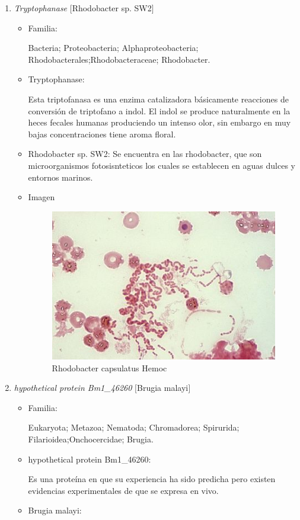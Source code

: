 \begin{enumerate}
	\item \emph{Tryptophanase} $[$Rhodobacter sp. SW2$]$~\cite{match3}
	\begin{itemize}
		\item Familia:
			
			Bacteria; Proteobacteria; Alphaproteobacteria; Rhodobacterales;Rhodobacteraceae; Rhodobacter.
		\item Tryptophanase:

			Esta triptofanasa es una enzima catalizadora básicamente reacciones de conversión de triptofano
			a indol.
			El indol se produce naturalmente en la heces fecales humanas produciendo un intenso olor,
			sin embargo en muy bajas concentraciones tiene aroma floral.
		\item Rhodobacter sp. SW2:
			Se encuentra en las rhodobacter, que son microorganismos fotosisnteticos los cuales
			se establecen en aguas dulces y entornos marinos.
		\item Imagen\\
			\begin{figure}[!h]
			\begin{center}
				\includegraphics[width=0.32\linewidth, height=!]{img/3}
				\caption{Rhodobacter capsulatus Hemoc}
			    \label{fig:match3}
			\end{center}
			\end{figure}
	\end{itemize}


	\item \emph{hypothetical protein Bm1\_46260} $[$Brugia malayi$]$~\cite{match4}
	\begin{itemize}
		\item Familia:

			Eukaryota; Metazoa; Nematoda; Chromadorea; Spirurida; Filarioidea;Onchocercidae; Brugia.
		\item hypothetical protein Bm1\_46260:

			Es una proteína en que su experiencia ha sido predicha pero existen evidencias experimentales
			de que se expresa en vivo.
		\item Brugia malayi:
			

\end{itemize}
\end{enumerate}
